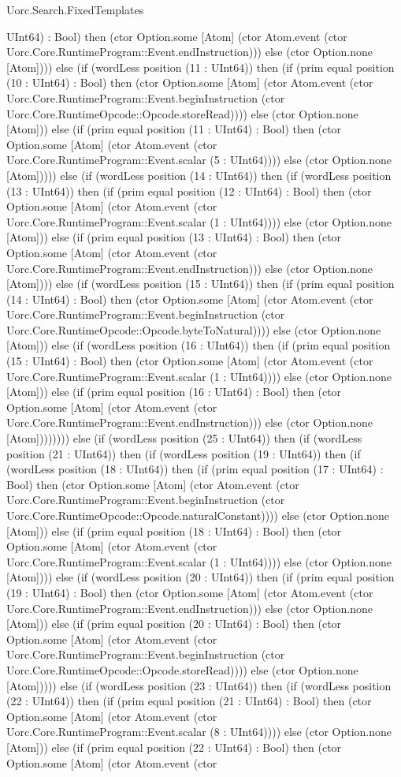 \begin{lexlean}{Uorc.Search.FixedTemplates}
\begin{semanticmodule}
{UInt64) : Bool) then (ctor Option.some [Atom] (ctor Atom.event (ctor Uorc.Core.RuntimeProgram::Event.endInstruction))) else (ctor Option.none [Atom]))) else (if (wordLess position (11 : UInt64)) then (if (prim equal position (10 : UInt64) : Bool) then (ctor Option.some [Atom] (ctor Atom.event (ctor Uorc.Core.RuntimeProgram::Event.beginInstruction (ctor Uorc.Core.RuntimeOpcode::Opcode.storeRead)))) else (ctor Option.none [Atom])) else (if (prim equal position (11 : UInt64) : Bool) then (ctor Option.some [Atom] (ctor Atom.event (ctor Uorc.Core.RuntimeProgram::Event.scalar (5 : UInt64)))) else (ctor Option.none [Atom])))) else (if (wordLess position (14 : UInt64)) then (if (wordLess position (13 : UInt64)) then (if (prim equal position (12 : UInt64) : Bool) then (ctor Option.some [Atom] (ctor Atom.event (ctor Uorc.Core.RuntimeProgram::Event.scalar (1 : UInt64)))) else (ctor Option.none [Atom])) else (if (prim equal position (13 : UInt64) : Bool) then (ctor Option.some [Atom] (ctor Atom.event (ctor Uorc.Core.RuntimeProgram::Event.endInstruction))) else (ctor Option.none [Atom]))) else (if (wordLess position (15 : UInt64)) then (if (prim equal position (14 : UInt64) : Bool) then (ctor Option.some [Atom] (ctor Atom.event (ctor Uorc.Core.RuntimeProgram::Event.beginInstruction (ctor Uorc.Core.RuntimeOpcode::Opcode.byteToNatural)))) else (ctor Option.none [Atom])) else (if (wordLess position (16 : UInt64)) then (if (prim equal position (15 : UInt64) : Bool) then (ctor Option.some [Atom] (ctor Atom.event (ctor Uorc.Core.RuntimeProgram::Event.scalar (1 : UInt64)))) else (ctor Option.none [Atom])) else (if (prim equal position (16 : UInt64) : Bool) then (ctor Option.some [Atom] (ctor Atom.event (ctor Uorc.Core.RuntimeProgram::Event.endInstruction))) else (ctor Option.none [Atom]))))))) else (if (wordLess position (25 : UInt64)) then (if (wordLess position (21 : UInt64)) then (if (wordLess position (19 : UInt64)) then (if (wordLess position (18 : UInt64)) then (if (prim equal position (17 : UInt64) : Bool) then (ctor Option.some [Atom] (ctor Atom.event (ctor Uorc.Core.RuntimeProgram::Event.beginInstruction (ctor Uorc.Core.RuntimeOpcode::Opcode.naturalConstant)))) else (ctor Option.none [Atom])) else (if (prim equal position (18 : UInt64) : Bool) then (ctor Option.some [Atom] (ctor Atom.event (ctor Uorc.Core.RuntimeProgram::Event.scalar (1 : UInt64)))) else (ctor Option.none [Atom]))) else (if (wordLess position (20 : UInt64)) then (if (prim equal position (19 : UInt64) : Bool) then (ctor Option.some [Atom] (ctor Atom.event (ctor Uorc.Core.RuntimeProgram::Event.endInstruction))) else (ctor Option.none [Atom])) else (if (prim equal position (20 : UInt64) : Bool) then (ctor Option.some [Atom] (ctor Atom.event (ctor Uorc.Core.RuntimeProgram::Event.beginInstruction (ctor Uorc.Core.RuntimeOpcode::Opcode.storeRead)))) else (ctor Option.none [Atom])))) else (if (wordLess position (23 : UInt64)) then (if (wordLess position (22 : UInt64)) then (if (prim equal position (21 : UInt64) : Bool) then (ctor Option.some [Atom] (ctor Atom.event (ctor Uorc.Core.RuntimeProgram::Event.scalar (8 : UInt64)))) else (ctor Option.none [Atom])) else (if (prim equal position (22 : UInt64) : Bool) then (ctor Option.some [Atom] (ctor Atom.event (ctor }
\end{semanticmodule}
\end{lexlean}
